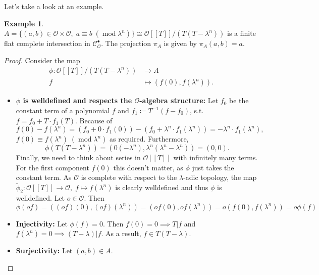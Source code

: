 \documentclass{article}
\theoremstyle{plain}%
\theoremstyle{definition}
\newtheorem{example}[theorem]{Example}
\theoremstyle{remark}
\newcommand{\cob}{\mathcal{C}_\mathcal{O}^\bullet}
\begin{document}
Let's take a look at an example.
\begin{example}\label{ex:first_1}\cite[cf.][example 1]{Darmon1995}
    \(A = \{(a,b) \in \mathcal{O}\times\mathcal{O},\; a \equiv b\; (\operatorname{mod} \lambda^n)\} 
    \cong \mathcal{O}[[T]]/(T(T-\lambda^n))\) is a finite flat complete intersection in \(\cob\).
    The projection \(\pi_A\) is given by \(\pi_A(a,b) = a\).
    \begin{proof}
        Consider the map
        \begin{align*}
            \phi\colon \mathcal{O}[[T]]/(T(T-\lambda^n)) &\to A\\
            f &\mapsto (f(0), f(\lambda^n)).
        \end{align*}
        \begin{itemize}
            \item \textbf{\(\phi\) is welldefined and respects the \(\mathcal{O}\)-algebra structure:}
                Let \(f_0\) be the constant term of a polynomial \(f\) and \(f_1 \coloneqq T^{-1}(f-f_0)\), 
                s.t. \(f = f_0 + T\cdot f_1(T)\). Because of
                \[
                    f(0) - f(\lambda^n) 
                    = (f_0 + 0\cdot f_1(0)) - (f_0 + \lambda^n \cdot f_1(\lambda^n)) 
                    = -\lambda^n \cdot f_1(\lambda^n),
                \]
                \(f(0) \equiv f(\lambda^n)\; (\operatorname{mod} \lambda^n)\) as required.
                Furthermore, \[\phi(T(T-\lambda^n)) = (0(-\lambda^n), \lambda^n(\lambda^n - \lambda^n)) = (0,0).\]
                Finally, we need to think about series in \(\mathcal{O}[[T]]\) with infinitely many terms.
                For the first component \(f(0)\) this doesn't matter, as \(\phi\) just takes the constant term. 
                As \(\mathcal{O}\) is complete with respect to the \(\lambda\)-adic topology, 
                the map \(\tilde\phi_2\colon \mathcal{O}[[T]] \to \mathcal{O},\; f \mapsto f(\lambda^n)\) 
                is clearly welldefined and thus \(\phi\) is welldefined.
                Let \(o \in \mathcal{O}\). Then 
                \[\phi(of) = ((of)(0),(of)(\lambda^n)) = (of(0), of(\lambda^n)) = o(f(0), f(\lambda^n)) = o\phi(f)\]
            \item \textbf{Injectivity:}
                Let \(\phi(f) = 0\). Then \(f(0) = 0 \implies T | f\) and \(f(\lambda^n) = 0 \implies (T - \lambda) | f\).
                As a result, \(f \in T(T-\lambda)\).
            \item \textbf{Surjectivity:}
                Let \((a,b) \in A\).

\end{itemize}
\end{proof}
\end{example}
\end{document}
